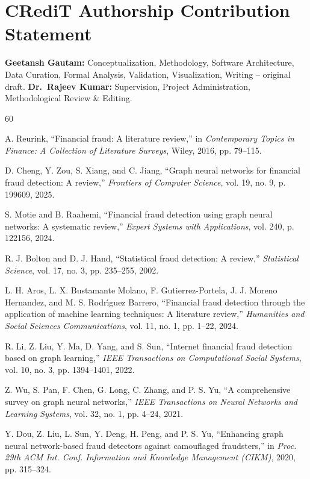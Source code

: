\documentclass[10pt,a4paper,twocolumn]{article}
\begin{document}
\section*{CRediT Authorship Contribution Statement}

\textbf{Geetansh Gautam:} Conceptualization, Methodology, Software Architecture, Data Curation, Formal Analysis, Validation, Visualization, Writing -- original draft. \textbf{Dr.\ Rajeev Kumar:} Supervision, Project Administration, Methodological Review \& Editing.

\begin{thebibliography}{60}
\footnotesize
\setlength{\itemsep}{1.5pt}
\setlength{\parskip}{0pt}

 A. Reurink, ``Financial fraud: A literature review,'' in \textit{Contemporary Topics in Finance: A Collection of Literature Surveys}, Wiley, 2016, pp. 79--115.

 D. Cheng, Y. Zou, S. Xiang, and C. Jiang, ``Graph neural networks for financial fraud detection: A review,'' \textit{Frontiers of Computer Science}, vol. 19, no. 9, p. 199609, 2025.

 S. Motie and B. Raahemi, ``Financial fraud detection using graph neural networks: A systematic review,'' \textit{Expert Systems with Applications}, vol. 240, p. 122156, 2024.

 R. J. Bolton and D. J. Hand, ``Statistical fraud detection: A review,'' \textit{Statistical Science}, vol. 17, no. 3, pp. 235--255, 2002.

 L. H. Aros, L. X. Bustamante Molano, F. Gutierrez-Portela, J. J. Moreno Hernandez, and M. S. Rodr\'{\i}guez Barrero, ``Financial fraud detection through the application of machine learning techniques: A literature review,'' \textit{Humanities and Social Sciences Communications}, vol. 11, no. 1, pp. 1--22, 2024.

 R. Li, Z. Liu, Y. Ma, D. Yang, and S. Sun, ``Internet financial fraud detection based on graph learning,'' \textit{IEEE Transactions on Computational Social Systems}, vol. 10, no. 3, pp. 1394--1401, 2022.

 Z. Wu, S. Pan, F. Chen, G. Long, C. Zhang, and P. S. Yu, ``A comprehensive survey on graph neural networks,'' \textit{IEEE Transactions on Neural Networks and Learning Systems}, vol. 32, no. 1, pp. 4--24, 2021.

 Y. Dou, Z. Liu, L. Sun, Y. Deng, H. Peng, and P. S. Yu, ``Enhancing graph neural network-based fraud detectors against camouflaged fraudsters,'' in \textit{Proc. 29th ACM Int. Conf. Information and Knowledge Management (CIKM)}, 2020, pp. 315--324.


\end{thebibliography}
\end{document}
